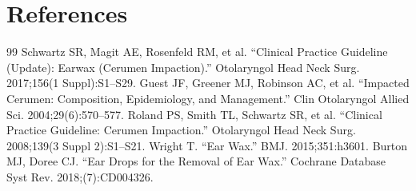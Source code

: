 \section*{References}
\begin{thebibliography}{99}
 Schwartz SR, Magit AE, Rosenfeld RM, et al. ``Clinical Practice Guideline (Update): Earwax (Cerumen Impaction).'' Otolaryngol Head Neck Surg. 2017;156(1 Suppl):S1--S29.
 Guest JF, Greener MJ, Robinson AC, et al. ``Impacted Cerumen: Composition, Epidemiology, and Management.'' Clin Otolaryngol Allied Sci. 2004;29(6):570--577.
 Roland PS, Smith TL, Schwartz SR, et al. ``Clinical Practice Guideline: Cerumen Impaction.'' Otolaryngol Head Neck Surg. 2008;139(3 Suppl 2):S1--S21.
 Wright T. ``Ear Wax.'' BMJ. 2015;351:h3601.
 Burton MJ, Doree CJ. ``Ear Drops for the Removal of Ear Wax.'' Cochrane Database Syst Rev. 2018;(7):CD004326.
\end{thebibliography}
